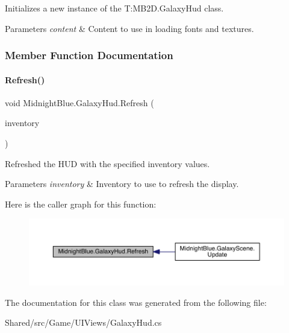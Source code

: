 Initializes a new instance of the T\+:\+M\+B2\+D.\+Galaxy\+Hud class. 


\begin{DoxyParams}{Parameters}
{\em content} & Content to use in loading fonts and textures.\\
\hline
\end{DoxyParams}


\subsubsection{Member Function Documentation}
\hypertarget{class_midnight_blue_1_1_galaxy_hud_aea2d04b212188a2e729ea327b7da0449}{}\label{class_midnight_blue_1_1_galaxy_hud_aea2d04b212188a2e729ea327b7da0449} 
\paragraph{\texorpdfstring{Refresh()}{Refresh()}}
{\footnotesize\ttfamily void Midnight\+Blue.\+Galaxy\+Hud.\+Refresh (\begin{DoxyParamCaption}\item[{Inventory}]{inventory }\end{DoxyParamCaption})\hspace{0.3cm}{\ttfamily [inline]}}



Refreshed the H\+UD with the specified inventory values. 


\begin{DoxyParams}{Parameters}
{\em inventory} & Inventory to use to refresh the display.\\
\hline
\end{DoxyParams}
Here is the caller graph for this function\+:\nopagebreak
\begin{figure}[H]
\begin{center}
\leavevmode
\includegraphics[width=350pt]{class_midnight_blue_1_1_galaxy_hud_aea2d04b212188a2e729ea327b7da0449_icgraph}
\end{center}
\end{figure}


The documentation for this class was generated from the following file\+:\begin{DoxyCompactItemize}
\item 
Shared/src/\+Game/\+U\+I\+Views/Galaxy\+Hud.\+cs\end{DoxyCompactItemize}
